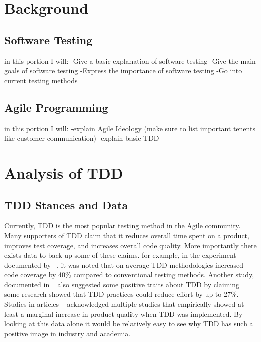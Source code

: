 \documentclass{sig-alternate}
\begin{document}
\section{Background}
\subsection{Software Testing}
in this portion I will:
-Give a basic explanation of software testing
-Give the main goals of software testing
-Express the importance of software testing
-Go into current testing methods

\subsection{Agile Programming}
in this portion I will:
-explain Agile Ideology (make sure to list important tenents like customer communication)
-explain basic TDD



\section{Analysis of TDD}
\subsection{TDD Stances and Data}
Currently, TDD is the most popular testing method in the Agile community.  Many supporters of TDD claim that it reduces overall time spent on a product, improves test coverage, and increases overall code quality.  More importantly there exists data to back up some of these claims.  for example, in the experiment documented by ~\cite{Lemos:2012}, it was noted that on average TDD methodologies increased code coverage by 40\% compared to conventional testing methods.  Another study, documented in ~\cite{Hellmann:2012} also suggested some positive traits about TDD by claiming some research showed that TDD practices could reduce effort by up to 27\%. Studies in articles ~\cite{Hellman:2012, Hammond:2012, Kettunen:2010} acknowledged multiple studies that empirically showed at least a marginal increase in product quality when TDD was implemented.  By looking at this data alone it would be relatively easy to see why TDD has such a positive image in industry and academia.
\end{document}
